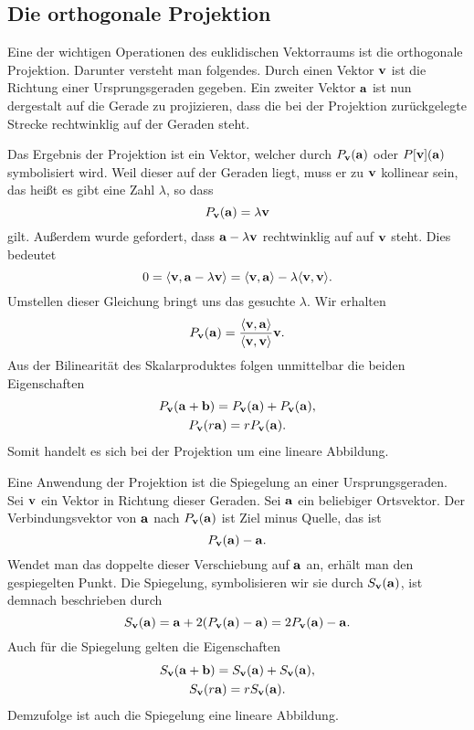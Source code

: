 \subsection{Die orthogonale Projektion}

Eine der wichtigen Operationen des euklidischen Vektorraums ist
die orthogonale Projektion. Darunter versteht man folgendes.
Durch einen Vektor $\mathbf{v}$ ist die Richtung einer Ursprungsgeraden
gegeben. Ein zweiter Vektor $\mathbf{a}$ ist nun dergestalt auf die
Gerade zu projizieren, dass die bei der Projektion zurückgelegte
Strecke rechtwinklig auf der Geraden steht.

Das Ergebnis der Projektion ist ein Vektor, welcher durch
$P_{\mathbf{v}}(\mathbf{a})$ oder $P[\mathbf{v}](\mathbf{a})$ symbolisiert wird.
Weil dieser auf der Geraden liegt, muss er zu $\mathbf{v}$ kollinear
sein, das heißt es gibt eine Zahl $\lambda$, so dass
\[P_{\mathbf{v}}(\mathbf{a}) = \lambda\mathbf{v}\]
gilt. Außerdem wurde gefordert, dass $\mathbf{a}-\lambda\mathbf{v}$
rechtwinklig auf auf $\mathbf{v}$ steht. Dies bedeutet
\[0 = \langle\mathbf{v},\mathbf{a}-\lambda\mathbf{v}\rangle
= \langle\mathbf{v},\mathbf{a}\rangle - \lambda\langle\mathbf{v},\mathbf{v}\rangle.\]
Umstellen dieser Gleichung bringt uns das gesuchte $\lambda$. Wir
erhalten
\[P_{\mathbf{v}}(\mathbf{a}) = \frac{\langle\mathbf{v},\mathbf{a}\rangle}
{\langle\mathbf{v},\mathbf{v}\rangle}\mathbf{v}.\]
Aus der Bilinearität des Skalarproduktes folgen unmittelbar
die beiden Eigenschaften
\begin{gather*}
P_{\mathbf{v}}(\mathbf{a}+\mathbf{b}) = P_{\mathbf{v}}(\mathbf{a})+P_{\mathbf{v}}(\mathbf{a}),\\
P_{\mathbf{v}}(r\mathbf{a}) = rP_{\mathbf{v}}(\mathbf{a}).
\end{gather*}
Somit handelt es sich bei der Projektion um eine lineare
Abbildung.

Eine Anwendung der Projektion ist die Spiegelung an einer
Ursprungsgeraden. Sei $\mathbf{v}$ ein Vektor in Richtung dieser
Geraden. Sei $\mathbf{a}$ ein beliebiger Ortsvektor.
Der Verbindungsvektor von $\mathbf{a}$ nach $P_{\mathbf{v}}(\mathbf{a})$
ist Ziel minus Quelle, das ist
\[P_{\mathbf{v}}(\mathbf{a}) - \mathbf{a}.\]
Wendet man das doppelte dieser Verschiebung auf $\mathbf{a}$ an,
erhält man den gespiegelten Punkt. Die Spiegelung, symbolisieren
wir sie durch $S_{\mathbf{v}}(\mathbf{a})$, ist demnach
beschrieben durch
\[S_{\mathbf{v}}(\mathbf{a}) = \mathbf{a} + 2(P_{\mathbf{v}}(\mathbf{a}) - \mathbf{a})
= 2P_{\mathbf{v}}(\mathbf{a}) - \mathbf{a}.\]
Auch für die Spiegelung gelten die Eigenschaften
\begin{gather*}
S_{\mathbf{v}}(\mathbf{a}+\mathbf{b}) = S_{\mathbf{v}}(\mathbf{a})+S_{\mathbf{v}}(\mathbf{a}),\\
S_{\mathbf{v}}(r\mathbf{a}) = rS_{\mathbf{v}}(\mathbf{a}).
\end{gather*}
Demzufolge ist auch die Spiegelung eine lineare Abbildung.

